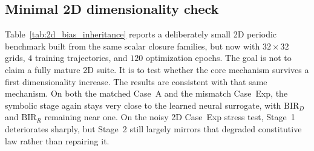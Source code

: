 \documentclass[preprint,12pt]{elsarticle}
\begin{document}
\subsection{Minimal 2D dimensionality check}

Table~\ref{tab:2d_bias_inheritance} reports a deliberately small 2D periodic benchmark built from the same scalar closure families, but now with $32\times 32$ grids, $4$ training trajectories, and $120$ optimization epochs. The goal is not to claim a fully mature 2D suite. It is to test whether the core mechanism survives a first dimensionality increase. The results are consistent with that same mechanism. On both the matched Case~A and the mismatch Case~Exp, the symbolic stage again stays very close to the learned neural surrogate, with $\mathrm{BIR}_D$ and $\mathrm{BIR}_R$ remaining near one. On the noisy 2D Case~Exp stress test, Stage~1 deteriorates sharply, but Stage~2 still largely mirrors that degraded constitutive law rather than repairing it.

\begin{table}[h]
\centering
\small
{}
\caption{Minimal 2D periodic dimensionality check with three seeds. The 2D benchmark is intentionally small and not tuned as aggressively as the 1D main suite, but it remains consistent with the same mechanism: symbolic compression stays close to the learned neural surrogate and inherits its constitutive bias rather than correcting it.}
\label{tab:2d_bias_inheritance}
\end{table}
\end{document}
